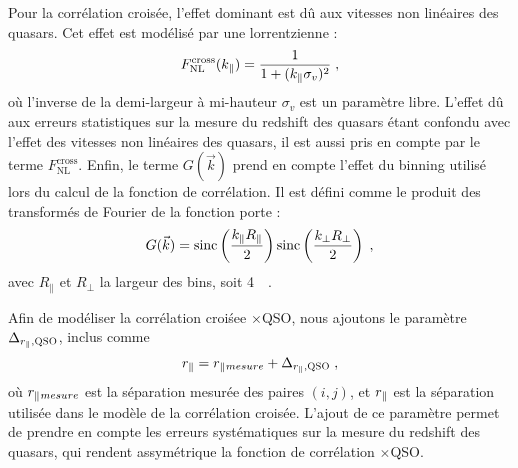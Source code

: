 \documentclass[11pt, twoside, a4paper, openright]{report}
\begin{document}
Pour la corrélation croisée, l'effet dominant est dû aux vitesses non linéaires des quasars. Cet effet est modélisé par une lorrentzienne :
\begin{equation}
  F_{\mathrm{NL}}^{\mathrm{cross}}(k_{\parallel}{}) = \frac{1}{1 + (k_{\parallel}{} \sigma_v)^2} \; ,
\end{equation}
où l'inverse de la demi-largeur à mi-hauteur $\sigma_v$ est un paramètre libre. L'effet dû aux erreurs statistiques sur la mesure du redshift des quasars étant confondu avec l'effet des vitesses non linéaires des quasars, il est aussi pris en compte par le terme $  F_{\mathrm{NL}}^{\mathrm{cross}}$.
Enfin, le terme $G(\vec k)$ prend en compte l'effet du binning utilisé lors du calcul de la fonction de corrélation.
Il est défini comme le produit des transformés de Fourier de la fonction porte :
\begin{equation}
  G(\vec k) = \mathrm{sinc}\left(\frac{k_{\parallel}{}R_{\parallel}}{2}\right)\mathrm{sinc}\left(\frac{k_{\perp}{}R_{\perp}}{2}\right) \; ,
\end{equation}
avec $R_{\parallel}$ et $R_{\perp}$ la largeur des bins, soit \SI{4}{\perh\Mpc}.

Afin de modéliser la corrélation croiśee \lya{}$\times$QSO, nous ajoutons le paramètre $\Delta_{r_{\parallel}{}, \textsc{QSO}}$, inclus comme
\begin{equation}
  r_{\parallel}{} = r_{\parallel}{}_{mesure} + \Delta_{r_{\parallel}{}, \textsc{QSO}} \; ,
\end{equation}
où $r_{\parallel}{}_{mesure}$ est la séparation mesurée des paires $(i,j)$, et $r_{\parallel}{}$ est la séparation utilisée dans le modèle de la corrélation croisée. L'ajout de ce paramètre permet de prendre en compte les erreurs systématiques sur la mesure du redshift des quasars, qui rendent assymétrique la fonction de corrélation \lya{}$\times$QSO.

\end{document}
